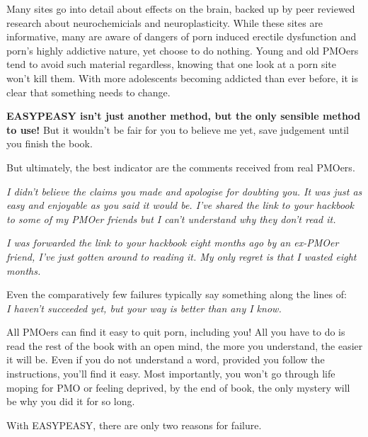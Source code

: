 \documentclass[easypeasy.tex]{subfiles}
\begin{document}
Many sites go into detail about effects on the brain, backed up by peer reviewed research about neurochemicials and neuroplasticity. While these sites are informative, many are aware of dangers of porn induced erectile dysfunction and porn's highly addictive nature, yet choose to do nothing. Young and old PMOers tend to avoid such material regardless, knowing that one look at a porn site won't kill them. With more adolescents becoming addicted than ever before, it is clear that something needs to change.

\textbf{EASYPEASY isn't just another method, but the only sensible method to use!} But it wouldn't be fair for you to believe me yet, save judgement until you finish the book.

But ultimately, the best indicator are the comments received from real PMOers.

\textit{I didn't believe the claims you made and apologise for doubting you. It was just as easy and enjoyable as you said it would be. I've shared the link to your hackbook to some of my PMOer friends but I can't understand why they don't read it.}

\textit{I was forwarded the link to your hackbook eight months ago by an ex-PMOer friend, I've just gotten around to reading it. My only regret is that I wasted eight months.}

Even the comparatively few failures typically say something along the lines of:\\ \textit{I haven't succeeded yet, but your way is better than any I know.}

All PMOers can find it easy to quit porn, including you! All you have to do is read the rest of the book with an open mind, the more you understand, the easier it will be. Even if you do not understand a word, provided you follow the instructions, you'll find it easy. Most importantly, you won't go through life moping for PMO or feeling deprived, by the end of book, the only mystery will be why you did it for so long.

With EASYPEASY, there are only two reasons for failure.
\end{document}
